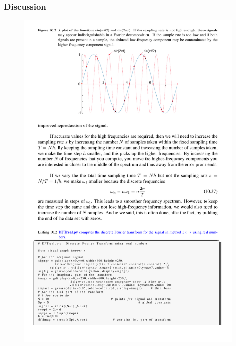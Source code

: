 \documentclass[hyperref={colorlinks=true}]{beamer}
\begin{document}

\begin{frame}%
  \frametitle{Discussion}

  \centering \Large {}
  
  \pause
  
  \begin{figure}
    \includegraphics[width=0.9\columnwidth]{Aliasing.pdf}
  \end{figure}
  
\end{frame}

\end{document}
